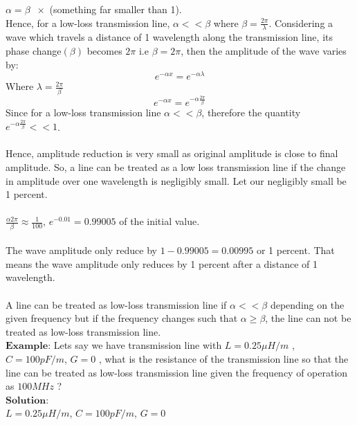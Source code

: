 	$\alpha = \beta \;\; \times$ (something far smaller than 1).\\
	Hence, for a low-loss transmission line, $\alpha << \beta$ where $\beta = \frac{2 \pi}{\lambda}$.
	Considering a wave which travels a distance of 1 wavelength along the transmission line, its phase change$(\beta)$ becomes $2\pi$ i.e $\beta= 2 \pi$, then the amplitude of the wave varies by:
	\begin{equation*}
	e^{-\alpha x} = e^{-\alpha \lambda}	
	\end{equation*}
	Where $\lambda = \frac{2 \pi}{\beta}$
	\begin{equation*}
	e^{- \alpha x} = e^{-\alpha \frac{2 \pi}{\beta}}
	\end{equation*}
	Since for a low-loss transmission line $\alpha<<\beta$, therefore the quantity $e^{-\alpha \frac{2 \pi}{\beta}} << 1$.\\
	\\Hence, amplitude reduction is very small as original amplitude is close to final amplitude. So, a line can be treated as a low loss transmission line if the change in amplitude over one wavelength is negligibly small. Let our negligibly small be 1 percent.
	\\\\ $\frac{\alpha 2 \pi}{\beta} \approx \frac{1}{100}$, $ e^{-0.01} = 0.99005$ of the initial value.\\\\The wave amplitude only reduce by $1-0.99005=0.00995$ or 1 percent. That means the wave amplitude only reduces by 1 percent after a distance of 1 wavelength.\\\\
	A line can be treated as low-loss transmission line if $\alpha << \beta$ depending on the given frequency but if the frequency changes such that $\alpha \geq \beta$, the line can not be treated as low-loss transmission line.\\
	
	$\boldsymbol{Example}$: Lets say we have transmission line with $L = 0.25\mu H/m$ , ${C= 100pF/m}$, $G = 0$ , what is the resistance of the transmission line so that the line can be treated as low-loss transmission line given the frequency of operation as $100MHz$ ?\\
	
	$\boldsymbol{Solution}$:\\
	
	$L= 0.25\mu H/m$, $C= 100pF/m$, $G = 0$\\
	  
